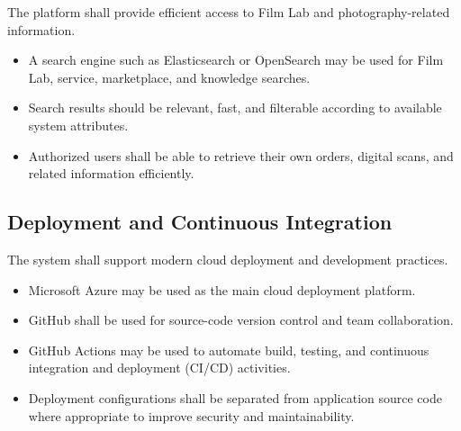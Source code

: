 The platform shall provide efficient access to Film Lab and photography-related
information.

\begin{itemize}
    \item A search engine such as Elasticsearch or OpenSearch may be used for
    Film Lab, service, marketplace, and knowledge searches.

    \item Search results should be relevant, fast, and filterable according
    to available system attributes.

    \item Authorized users shall be able to retrieve their own orders,
    digital scans, and related information efficiently.
\end{itemize}

\subsection{Deployment and Continuous Integration}

The system shall support modern cloud deployment and development practices.

\begin{itemize}
    \item Microsoft Azure may be used as the main cloud deployment platform.

    \item GitHub shall be used for source-code version control and team
    collaboration.

    \item GitHub Actions may be used to automate build, testing, and
    continuous integration and deployment (CI/CD) activities.

    \item Deployment configurations shall be separated from application
    source code where appropriate to improve security and maintainability.
\end{itemize}